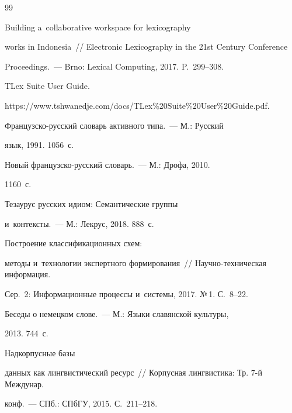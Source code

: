 {{\begin{thebibliography}{99}

 Building a~collaborative workspace for lexicography 

works in Indonesia~/\!\!/ Electronic Lexicography in the 21st Century Conference 

Proceedings.~--- Brno: Lexical Computing, 2017. P.~299--308.


TLex Suite User Guide. 

{\sf https://www.tshwanedje.com/docs/TLex\%20Suite\%20User\linebreak \%20Guide.pdf}.




 Французско-русский словарь активного типа.~--- М.: Русский 

язык, 1991. 1056~с.




 Новый французско-русский словарь.~--- М.: Дрофа, 2010. 

1160~с.




 Тезаурус русских идиом: Семантические группы 

и~контексты.~--- М.: Лекрус, 2018. 888~с.


 Построение классификационных схем: 

методы и~технологии экспертного формирования~/\!\!/ Научно-техническая информация. 

Сер.~2: Информационные процессы и~системы, 2017. №\,1. С.~8--22.


 Беседы о немецком слове.~--- М.: Языки славянской культуры, 

2013. 744~с.


 Надкорпусные базы 

данных как лингвистический ресурс~/\!\!/ Корпусная лингвистика: Тр. 7-й Междунар. 

конф.~--- СПб.: СПбГУ, 2015. С.~211--218.




\end{thebibliography}}}

